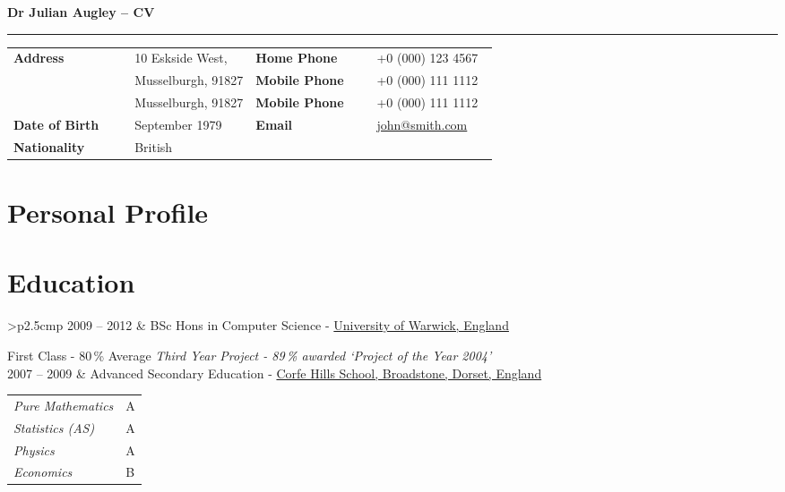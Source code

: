\documentclass{article}
\begin{document}
{\huge\color{slateblue}\textbf{Dr Julian Augley -- CV}\par}
\rule{\textwidth}{0.5mm}\par

\vspace{5ex}

\begin{tabular}{
		>{\bfseries}p{.25\linewidth}
		p{0.25\linewidth}
		>{\bfseries}p{0.25\linewidth}
		p{0.25\linewidth}
	}
	Address       & 10 Eskside West,           & Home Phone   & +0 (000) 123 4567\\
	              & Musselburgh, 91827         & Mobile Phone & +0 (000) 111 1112 \\
				  & Musselburgh, 91827         & Mobile Phone & +0 (000) 111 1112 \\
	Date of Birth & \nth{7} September 1979 & Email        & \href{mailto:john@smith.com}{john@smith.com} \\
	Nationality   & British\\
\end{tabular}

\vspace{5ex}


\section{Personal Profile}

\blindtext


\section{Education}

\begin{tabular}{>{\bfseries}p{2.5cm}p{\linewidth-2.5cm\relax}}
	2009 -- 2012 & BSc Hons in Computer Science -
	\href{http://www.warwick.ac.uk}{University of Warwick, England} \par
	First Class - 80\,\% Average\medbreak
	\textit{Third Year Project - 89\,\% awarded `Project of the Year 2004'}\\[2ex]
	2007 -- 2009 & Advanced Secondary Education -
	\href{http://www.corfe-hills.dorset.sch.uk}{Corfe Hills School,
	Broadstone, Dorset, England}\par
	\begin{tabular}{>{\itshape}l@{\enspace}l}
		Pure Mathematics & A \\
		Statistics (AS)  & A \\
		Physics          & A \\
		Economics        & B
	\end{tabular}
\end{tabular}
\end{document}
